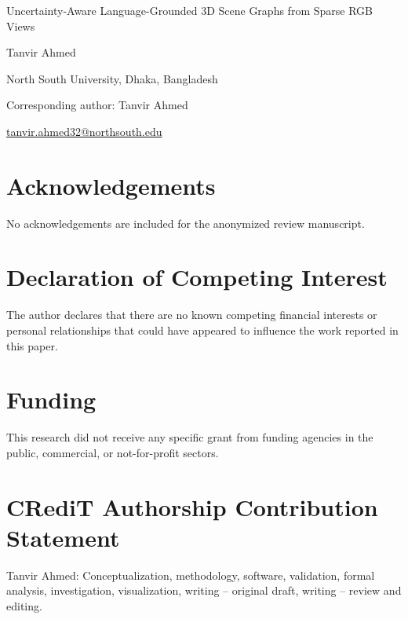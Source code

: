 \documentclass[12pt]{article}
\begin{document}
\begin{center}
{\LARGE Uncertainty-Aware Language-Grounded 3D Scene Graphs from Sparse RGB Views\par}
\vspace{1.5em}
{\large Tanvir Ahmed\par}
\vspace{0.5em}
North South University, Dhaka, Bangladesh\par
\vspace{0.5em}
Corresponding author: Tanvir Ahmed\par
\href{mailto:tanvir.ahmed32@northsouth.edu}{tanvir.ahmed32@northsouth.edu}
\end{center}

\section*{Acknowledgements}

No acknowledgements are included for the anonymized review manuscript.

\section*{Declaration of Competing Interest}

The author declares that there are no known competing financial interests or personal
relationships that could have appeared to influence the work reported in this paper.

\section*{Funding}

This research did not receive any specific grant from funding agencies in the public,
commercial, or not-for-profit sectors.

\section*{CRediT Authorship Contribution Statement}

Tanvir Ahmed: Conceptualization, methodology, software, validation, formal analysis,
investigation, visualization, writing -- original draft, writing -- review and editing.
\end{document}
